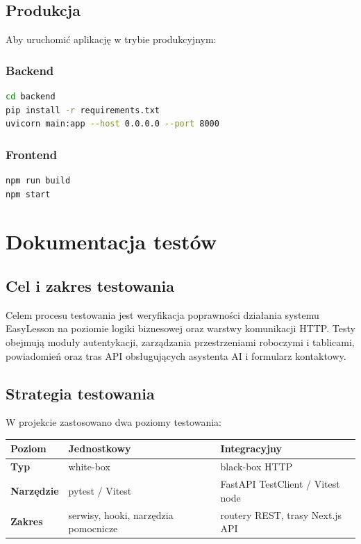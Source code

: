 \documentclass[12pt,a4paper]{article}
\begin{document}
\subsection{Produkcja}

Aby uruchomić aplikację w trybie produkcyjnym:

\subsubsection{Backend}

\begin{lstlisting}[language=bash]
cd backend
pip install -r requirements.txt
uvicorn main:app --host 0.0.0.0 --port 8000
\end{lstlisting}

\subsubsection{Frontend}

\begin{lstlisting}[language=bash]
npm run build
npm start
\end{lstlisting}


\newpage
\section{Dokumentacja testów}

\subsection{Cel i zakres testowania}

Celem procesu testowania jest weryfikacja poprawności działania systemu EasyLesson na poziomie logiki biznesowej oraz warstwy komunikacji HTTP. Testy obejmują moduły autentykacji, zarządzania przestrzeniami roboczymi i tablicami, powiadomień oraz tras API obsługujących asystenta AI i formularz kontaktowy.

\subsection{Strategia testowania}

W projekcie zastosowano dwa poziomy testowania:

\begin{center}
\begin{tabular}{lll}
\toprule
\textbf{Poziom} & Jednostkowy & Integracyjny \\
\midrule
\textbf{Typ} & white-box & black-box HTTP \\
\textbf{Narzędzie} & pytest / Vitest & FastAPI TestClient / Vitest node \\
\textbf{Zakres} & serwisy, hooki, narzędzia pomocnicze & routery REST, trasy Next.js API \\
\bottomrule
\end{tabular}
\end{center}
\end{document}
